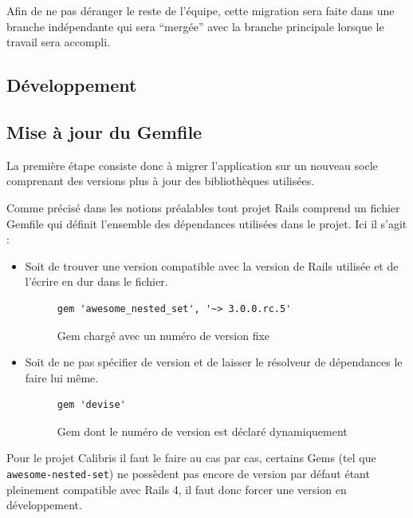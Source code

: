 \documentclass[12pt,a4paper]{book}
\begin{document}
Afin de ne pas déranger le reste de l'équipe, cette migration sera faite dans une branche indépendante qui sera ``mergée'' avec la branche principale lorsque le travail sera accompli.

\subsection{Développement}

\subsection{Mise à jour du Gemfile}

La première étape consiste donc à migrer l'application sur un nouveau socle comprenant des versions plus à jour des bibliothèques utilisées.

Comme précisé dans les notions préalables tout projet Rails comprend un fichier Gemfile qui définit l'ensemble des dépendances utilisées dans le projet. Ici il s'agit :
\begin{itemize}
  \item Soit de trouver une version compatible avec la version de Rails utilisée et de l'écrire en dur dans le fichier.
  
    \begin{figure}[h]
    \lstset{language=ruby}
    \begin{lstlisting}
gem 'awesome_nested_set', '~> 3.0.0.rc.5'
    \end{lstlisting}
     \caption{Gem chargé avec un numéro de version fixe}
    \end{figure}
    
  \item Soit de ne pas spécifier de version et de laisser le résolveur de dépendances le faire lui même.
  
    \begin{figure}[h]
    \lstset{language=ruby}
    \begin{lstlisting}
gem 'devise'
    \end{lstlisting}
     \caption{Gem dont le numéro de version est déclaré dynamiquement}
    \end{figure}
\end{itemize}

Pour le projet Calibris il faut le faire au cas par cas, certains Gems (tel que \texttt{awesome-nested-set}) ne possèdent pas encore de version par défaut étant pleinement compatible avec Rails 4, il faut donc forcer une version en développement.
\end{document}
